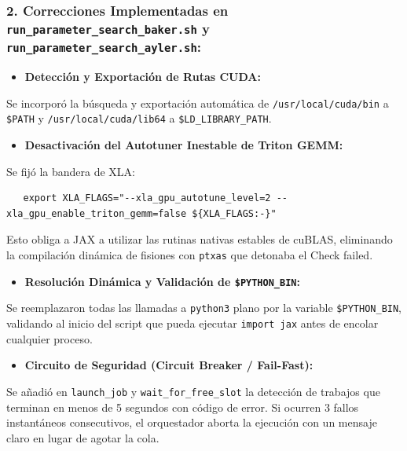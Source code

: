 \documentclass[10pt,a4paper]{article}
\begin{document}
\subsubsection{2. Correcciones Implementadas en \texttt{run\_parameter\_search\_baker.sh} y \texttt{run\_parameter\_search\_ayler.sh}:}

\begin{itemize}
\item \textbf{Detección y Exportación de Rutas CUDA:}
\end{itemize}

   Se incorporó la búsqueda y exportación automática de \texttt{/usr/local/cuda/bin} a \texttt{\$PATH} y \texttt{/usr/local/cuda/lib64} a \texttt{\$LD\_LIBRARY\_PATH}.

\begin{itemize}
\item \textbf{Desactivación del Autotuner Inestable de Triton GEMM:}
\end{itemize}

   Se fijó la bandera de XLA:

\begin{lstlisting}
   export XLA_FLAGS="--xla_gpu_autotune_level=2 --xla_gpu_enable_triton_gemm=false ${XLA_FLAGS:-}"
\end{lstlisting}

   Esto obliga a JAX a utilizar las rutinas nativas estables de cuBLAS, eliminando la compilación dinámica de fisiones con \texttt{ptxas} que detonaba el Check failed.

\begin{itemize}
\item \textbf{Resolución Dinámica y Validación de \texttt{\$PYTHON\_BIN}:}
\end{itemize}

   Se reemplazaron todas las llamadas a \texttt{python3} plano por la variable \texttt{\$PYTHON\_BIN}, validando al inicio del script que pueda ejecutar \texttt{import jax} antes de encolar cualquier proceso.

\begin{itemize}
\item \textbf{Circuito de Seguridad (Circuit Breaker / Fail-Fast):}
\end{itemize}

   Se añadió en \texttt{launch\_job} y \texttt{wait\_for\_free\_slot} la detección de trabajos que terminan en menos de 5 segundos con código de error. Si ocurren 3 fallos instantáneos consecutivos, el orquestador aborta la ejecución con un mensaje claro en lugar de agotar la cola.
\end{document}
